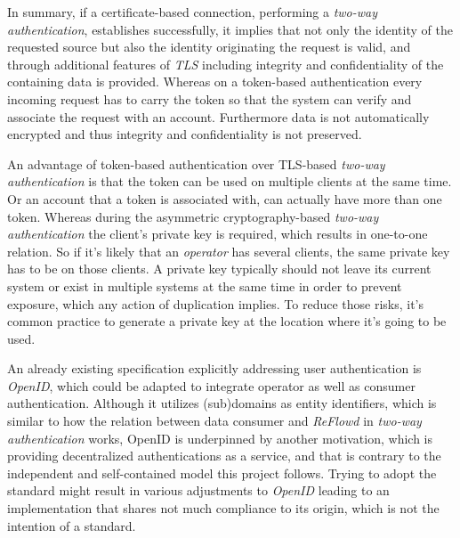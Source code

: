 \documentclass[12pt,english,a4paper,titlepage,cleardoublepage=empty,dottedtoc]{report}
\begin{document}
In summary, if a certificate-based connection, performing a
\emph{two-way authentication}, establishes successfully, it implies that
not only the identity of the requested source but also the identity
originating the request is valid, and through additional features of
\emph{TLS} including integrity and confidentiality of the containing
data is provided. Whereas on a token-based authentication every incoming
request has to carry the token so that the system can verify and
associate the request with an account. Furthermore data is not
automatically encrypted and thus integrity and confidentiality is not
preserved.

An advantage of token-based authentication over TLS-based \emph{two-way
authentication} is that the token can be used on multiple clients at the
same time. Or an account that a token is associated with, can actually
have more than one token. Whereas during the asymmetric
cryptography-based \emph{two-way authentication} the client's private
key is required, which results in one-to-one relation. So if it's likely
that an \emph{operator} has several clients, the same private key has to
be on those clients. A private key typically should not leave its
current system or exist in multiple systems at the same time in order to
prevent exposure, which any action of duplication implies. To reduce
those risks, it's common practice to generate a private key at the
location where it's going to be used.

An already existing specification explicitly addressing user
authentication is \emph{OpenID}, which could be adapted to integrate
operator as well as consumer authentication. Although it utilizes
(sub)domains as entity identifiers, which is similar to how the relation
between data consumer and \emph{ReFlowd} in \emph{two-way
authentication} works, OpenID is underpinned by another motivation,
which is providing decentralized authentications as a service, and that
is contrary to the independent and self-contained model this project
follows. Trying to adopt the standard might result in various
adjustments to \emph{OpenID} leading to an implementation that shares
not much compliance to its origin, which is not the intention of a
standard.
\end{document}
